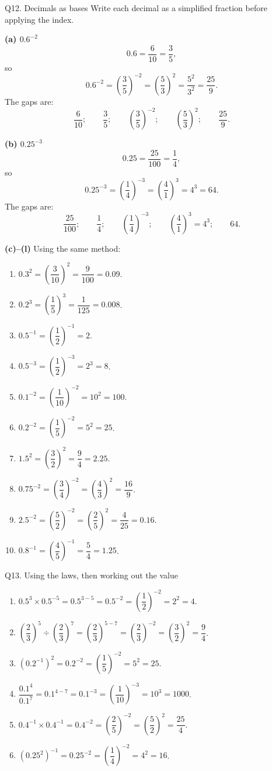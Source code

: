 \documentclass[12pt,a4paper]{article}
\begin{document}
\begin{solution}{Q12. Decimals as bases}
Write each decimal as a simplified fraction before applying the index.

\textbf{(a) \(0.6^{-2}\)}
\[
0.6=\frac{6}{10}=\frac35,
\]
so
\[
0.6^{-2}=\left(\frac35\right)^{-2}
=\left(\frac53\right)^2
=\frac{5^2}{3^2}
=\frac{25}{9}.
\]
The gaps are:
\[
\frac{6}{10};\qquad \frac35;\qquad
\left(\frac35\right)^{-2};\qquad
\left(\frac53\right)^2;\qquad
\frac{25}{9}.
\]

\textbf{(b) \(0.25^{-3}\)}
\[
0.25=\frac{25}{100}=\frac14,
\]
so
\[
0.25^{-3}=\left(\frac14\right)^{-3}
=\left(\frac41\right)^3
=4^3
=64.
\]
The gaps are:
\[
\frac{25}{100};\qquad \frac14;\qquad
\left(\frac14\right)^{-3};\qquad
\left(\frac41\right)^3=4^3;\qquad
64.
\]

\textbf{(c)--(l)} Using the same method:
\begin{enumerate}[label=\textbf{(\alph*)},start=3]
\item \(0.3^2=\left(\dfrac3{10}\right)^2=\dfrac9{100}=0.09\).
\item \(0.2^3=\left(\dfrac15\right)^3=\dfrac1{125}=0.008\).
\item \(0.5^{-1}=\left(\dfrac12\right)^{-1}=2\).
\item \(0.5^{-3}=\left(\dfrac12\right)^{-3}=2^3=8\).
\item \(0.1^{-2}=\left(\dfrac1{10}\right)^{-2}=10^2=100\).
\item \(0.2^{-2}=\left(\dfrac15\right)^{-2}=5^2=25\).
\item \(1.5^2=\left(\dfrac32\right)^2=\dfrac94=2.25\).
\item \(0.75^{-2}=\left(\dfrac34\right)^{-2}=\left(\dfrac43\right)^2=\dfrac{16}{9}\).
\item \(2.5^{-2}=\left(\dfrac52\right)^{-2}=\left(\dfrac25\right)^2=\dfrac4{25}=0.16\).
\item \(0.8^{-1}=\left(\dfrac45\right)^{-1}=\dfrac54=1.25\).
\end{enumerate}
\end{solution}

\begin{solution}{Q13. Using the laws, then working out the value}
\begin{enumerate}[label=\textbf{(\alph*)}]
\item \(0.5^3\times0.5^{-5}=0.5^{3-5}=0.5^{-2}
=\left(\dfrac12\right)^{-2}=2^2=4\).
\item \(\left(\dfrac23\right)^5\div\left(\dfrac23\right)^7
=\left(\dfrac23\right)^{5-7}
=\left(\dfrac23\right)^{-2}
=\left(\dfrac32\right)^2=\dfrac94\).
\item \((0.2^{-1})^2=0.2^{-2}
=\left(\dfrac15\right)^{-2}=5^2=25\).
\item \(\dfrac{0.1^4}{0.1^7}=0.1^{4-7}=0.1^{-3}
=\left(\dfrac1{10}\right)^{-3}=10^3=1000\).
\item \(0.4^{-1}\times0.4^{-1}=0.4^{-2}
=\left(\dfrac25\right)^{-2}
=\left(\dfrac52\right)^2=\dfrac{25}{4}\).
\item \((0.25^2)^{-1}=0.25^{-2}
=\left(\dfrac14\right)^{-2}=4^2=16\).
\end{enumerate}
\end{solution}
\end{document}
